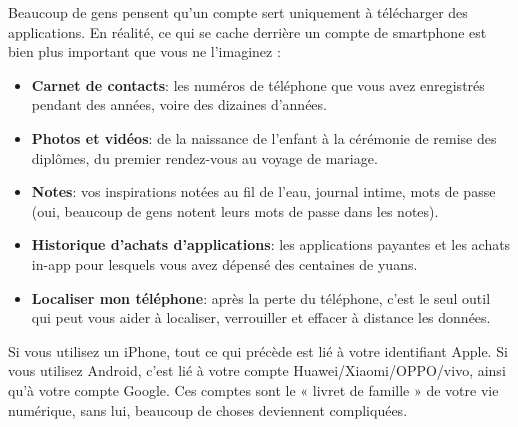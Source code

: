 


Beaucoup de gens pensent qu'un compte sert uniquement à télécharger des applications. En réalité, ce qui se cache derrière un compte de smartphone est bien plus important que vous ne l'imaginez :

\begin{itemize}
  \item \textbf{Carnet de contacts}: les numéros de téléphone que vous avez enregistrés pendant des années, voire des dizaines d'années.
  \item \textbf{Photos et vidéos}: de la naissance de l'enfant à la cérémonie de remise des diplômes, du premier rendez-vous au voyage de mariage.
  \item \textbf{Notes}: vos inspirations notées au fil de l'eau, journal intime, mots de passe (oui, beaucoup de gens notent leurs mots de passe dans les notes).
  \item \textbf{Historique d'achats d'applications}: les applications payantes et les achats in-app pour lesquels vous avez dépensé des centaines de yuans.
  \item \textbf{Localiser mon téléphone}: après la perte du téléphone, c'est le seul outil qui peut vous aider à localiser, verrouiller et effacer à distance les données.
\end{itemize}

Si vous utilisez un iPhone, tout ce qui précède est lié à votre identifiant Apple. Si vous utilisez Android, c'est lié à votre compte Huawei/Xiaomi/OPPO/vivo, ainsi qu'à votre compte Google. Ces comptes sont le « livret de famille » de votre vie numérique, sans lui, beaucoup de choses deviennent compliquées.


